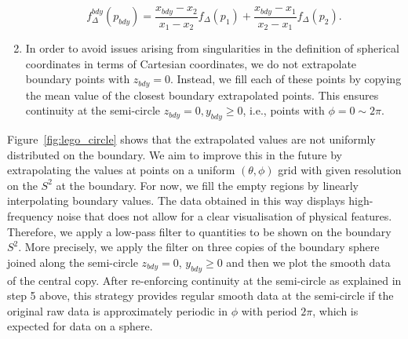 \documentclass[aps,letterpaper,twocolumn,nofootinbib]{revtex4}
\numberwithin{equation}{section}
\begin{document}
\begin{enumerate}
 \begin{equation}
 \label{eq:firstordextrap}
 f^{bdy}_{\Delta}(p_{bdy})=\frac{x_{bdy}-x_2}{x_1-x_2}f_\Delta(p_1)+\frac{x_{bdy}-x_1}{x_2-x_1}f_\Delta(p_2).
 \end{equation}
 \item In order to avoid issues arising from singularities in the definition of spherical coordinates in terms of Cartesian coordinates, we do not extrapolate boundary points with $z_{bdy}=0$. 
Instead, we fill each of these points by copying the mean value of the closest boundary extrapolated points. This ensures continuity at the semi-circle $z_{bdy}=0, y_{bdy}\geq 0$, i.e., points with $\phi=0\sim 2\pi$.
 \end{enumerate}
 
Figure~\ref{fig:lego_circle} shows that the extrapolated values are not uniformly distributed on the boundary. 
We aim to improve this in the future by extrapolating the values at points on a uniform $(\theta,\phi)$ grid with given resolution on the $S^2$ at the boundary. For now, we fill the empty regions by linearly interpolating boundary values. The data obtained in this way displays high-frequency noise that does not allow for a clear visualisation of physical features. Therefore, we apply a low-pass filter to quantities to be shown on the boundary $S^2$. More precisely, we apply the filter on three copies of the boundary sphere joined along the semi-circle $z_{bdy}=0$, $y_{bdy}\geq 0$ and then we plot the smooth data of the central copy. After re-enforcing continuity at the semi-circle as explained in step 5 above, this strategy provides regular smooth data at the semi-circle if the original raw data is approximately periodic in $\phi$ with period $2\pi$, which is expected for data on a sphere.
\end{document}
